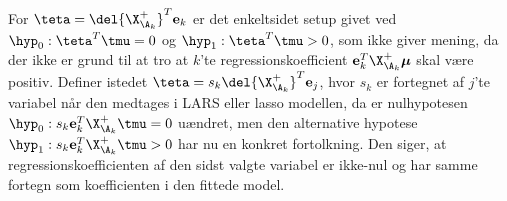 For \(\teta = \del{\X_{\A_k}^+}^T \mathbf{e}_k\) er det enkeltsidet setup givet ved \(\hyp_0: \teta^T \tmu = 0\) og  \(\hyp_1: \teta^T \tmu > 0\), som ikke giver mening, da der ikke er grund til at tro at \(k\)'te regressionskoefficient \(\mathbf{e}_k^T \X_{\A_k}^+ \boldsymbol{\mu}\) skal være positiv.
Definer istedet \(\teta = s_k \del{\X_{\A_k}^+}^T \mathbf{e}_j\), hvor \(s_k\) er fortegnet af \(j\)'te variabel når den medtages i LARS eller lasso modellen, da er nulhypotesen \(\hyp_0: s_k \mathbf{e}_k^T \X_{\A_k}^+ \tmu = 0\) uændret, men den alternative hypotese \(\hyp_1: s_k \mathbf{e}_k^T \X_{\A_k}^+ \tmu > 0\) har nu en konkret fortolkning.
Den siger, at regressionskoefficienten af den sidst valgte variabel er ikke-nul og har samme fortegn som koefficienten i den fittede model.